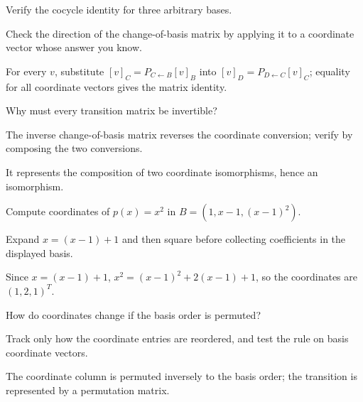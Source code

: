 \begin{exercise}\label{exr:i04-03}
Verify the cocycle identity for three arbitrary bases.
\end{exercise}
\begin{hint}
Check the direction of the change-of-basis matrix by applying it to a coordinate vector whose answer you know.
\end{hint}
\begin{solution}
For every $v$, substitute $[v]_C=P_{C\leftarrow B}[v]_B$ into $[v]_D=P_{D\leftarrow C}[v]_C$; equality for all coordinate vectors gives the matrix identity.
\end{solution}

\begin{exercise}\label{exr:i04-04}
Why must every transition matrix be invertible?
\end{exercise}
\begin{hint}
The inverse change-of-basis matrix reverses the coordinate conversion; verify by composing the two conversions.
\end{hint}
\begin{solution}
It represents the composition of two coordinate isomorphisms, hence an isomorphism.
\end{solution}

\begin{exercise}\label{exr:i04-05}
Compute coordinates of $p(x)=x^2$ in $B=(1,x-1,(x-1)^2)$.
\end{exercise}
\begin{hint}
Expand $x=(x-1)+1$ and then square before collecting coefficients in the displayed basis.
\end{hint}
\begin{solution}
Since $x=(x-1)+1$, $x^2=(x-1)^2+2(x-1)+1$, so the coordinates are $(1,2,1)^T$.
\end{solution}

\begin{exercise}\label{exr:i04-06}
How do coordinates change if the basis order is permuted?
\end{exercise}
\begin{hint}
Track only how the coordinate entries are reordered, and test the rule on basis coordinate vectors.
\end{hint}
\begin{solution}
The coordinate column is permuted inversely to the basis order; the transition is represented by a permutation matrix.
\end{solution}

